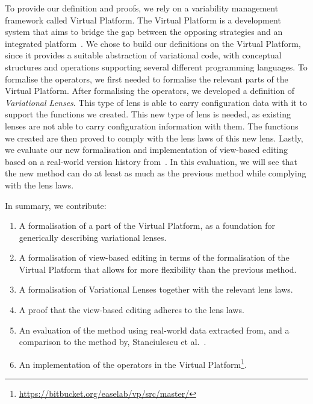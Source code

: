 To provide our definition and proofs, we rely on a variability management
framework called Virtual Platform. The Virtual Platform is a development system
that aims to bridge the gap between the opposing strategies \emph{\co} and
an integrated platform~\cite{mahmood2021}.
We chose to build our definitions on the Virtual Platform, since it provides a suitable abstraction of
variational code, with conceptual structures and operations supporting several 
different programming languages.
To formalise the operators, we first needed to formalise the relevant parts of the 
Virtual Platform. After formalising the operators, we developed a
definition of \emph{Variational Lenses}. This type of lens is able to carry
configuration data with it to support the functions we created. This new type of
lens is needed, as existing lenses are not able to carry configuration information
with them. The functions we created are then proved to comply with the lens laws 
of this new lens. Lastly, we evaluate our new formalisation and implementation of view-based editing
based on a real-world version history from~\cite{stuanciulescu2016}. In this evaluation,
we will see that the new method can do at least as much as the previous method
while complying with the lens laws. 

In summary, we contribute:
\begin{enumerate}
    \itemsep -.2em
    \item A formalisation of a part of the Virtual Platform, as a foundation for generically describing variational lenses.
    \item A formalisation of view-based editing in terms of the formalisation of the Virtual Platform that allows for more flexibility than the previous method.
    \item A formalisation of Variational Lenses together with the relevant lens laws.
    \item A proof that the view-based editing adheres to the lens laws.
    \item An evaluation of the method using real-world data extracted from, and a comparison to the method by, Stanciulescu et al.~\cite{stuanciulescu2016}.
    \item An implementation of the operators in the Virtual Platform\footnote{\url{https://bitbucket.org/easelab/vp/src/master/}}.
\end{enumerate}
